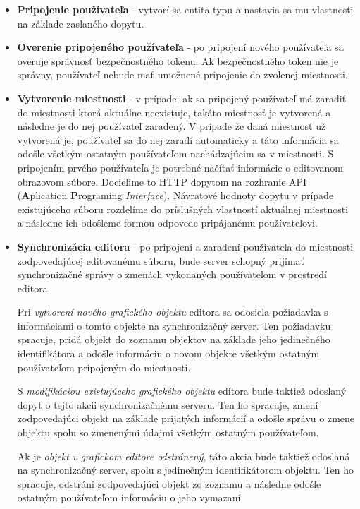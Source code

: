 \begin{itemize}
	\item \textbf{Pripojenie používateľa} - vytvorí sa entita typu  a nastavia sa mu vlastnosti na základe zaslaného dopytu. 
	
	\item \textbf{Overenie pripojeného používateľa} - po pripojení nového používateľa sa overuje správnosť bezpečnostného tokenu. Ak bezpečnostného token nie je správny, používateľ nebude mať umožnené pripojenie do zvolenej miestnosti.
	
	\item \textbf{Vytvorenie miestnosti} - v prípade, ak sa pripojený používateľ má zaradiť do miestnosti ktorá aktuálne neexistuje, takáto miestnosť je vytvorená a následne je do nej používateľ zaradený. V prípade že daná miestnosť už vytvorená je, používateľ sa do nej zaradí automaticky a táto informácia sa odošle všetkým ostatným používateľom nachádzajúcim sa v miestnosti. S pripojením prvého používateľa je potrebné načítať informácie o editovanom obrazovom súbore. Docielime to HTTP dopytom na rozhranie API (\textbf{A}plication \textbf{P}rograming \textit{Interface}). Návratové hodnoty dopytu v prípade existujúceho súboru rozdelíme do príslušných vlastností aktuálnej miestnosti a následne ich odošleme formou odpovede pripájanému používateľovi.
	
	\item \textbf{Synchronizácia editora} - po pripojení a zaradení používateľa do miestnosti zodpovedajúcej editovanému súboru, bude server schopný prijímať synchronizačné správy o zmenách vykonaných používateľom v prostredí editora. 
	
	Pri \textit{vytvorení nového grafického objektu} editora sa odosiela požiadavka s informáciami o tomto objekte na synchronizačný server. Ten požiadavku spracuje, pridá objekt do zoznamu objektov na základe jeho jedinečného identifikátora a odošle informáciu o novom objekte všetkým ostatným používateľom pripojeným do miestnosti.
	
	S \textit{modifikáciou existujúceho grafického objektu} editora bude taktiež odoslaný dopyt o tejto akcii synchronizačnému serveru. Ten ho spracuje, zmení zodpovedajúci objekt na základe prijatých informácií a odošle správu o zmene objektu spolu so zmenenými údajmi všetkým ostatným používateľom.
	
	Ak je \textit{objekt v grafickom editore odstránený}, táto akcia bude taktiež odoslaná na synchronizačný server, spolu s jedinečným identifikátorom objektu. Ten ho spracuje, odstráni zodpovedajúci objekt zo zoznamu a následne odošle ostatným používateľom informáciu o jeho vymazaní.
	

\end{itemize}
